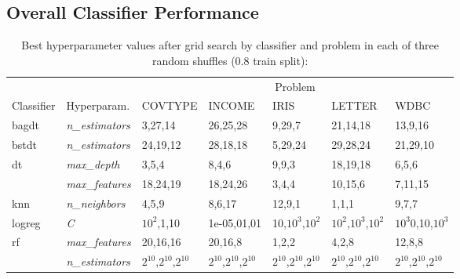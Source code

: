 \documentclass[twoside,11pt]{article}
\begin{document}
		\subsection{Overall Classifier Performance}
			\lipsum
			
			\begin{table}[ph!]
				\caption{Best hyperparameter values after grid search by classifier and problem in each of three random shuffles (0.8 train split):}
				\label{tab:best_hyperparams_by_problem_shuffles}
				\begin{tabular}{lllllll}
					\toprule
					& & \multicolumn{5}{c}{Problem} \\\cline{3-7}
					Classifier & Hyperparam. &         COVTYPE &           INCOME &               IRIS &              LETTER &                 WDBC \\
					\midrule
					bagdt & \textit{n\_estimators} &         3,27,14 &         26,25,28 &             9,29,7 &            21,14,18 &              13,9,16 \\
					bstdt & \textit{n\_estimators}  &        24,19,12 &         28,18,18 &            5,29,24 &            29,28,24 &             21,29,10 \\
					\multirow{2}{*}{dt} & \textit{max\_depth} &           3,5,4 &            8,4,6 &              9,9,3 &            18,19,18 &                6,5,6 \\
					& \textit{max\_features} &        18,24,19 &         18,24,26 &              3,4,4 &             10,15,6 &              7,11,15 \\
					knn & \textit{n\_neighbors} &           4,5,9 &           8,6,17 &             12,9,1 &               1,1,1 &                9,7,7 \\
					logreg & \textit{C} &  $10^2$,1,10 &  1e-05,01,01 &  10,$10^3$,$10^2$ &  $10^2$,$10^3$,$10^2$ &  $10^3$0,10,$10^3$ \\
					\multirow{2}{*}{rf} & \textit{max\_features} &        20,16,16 &          20,16,8 &              1,2,2 &               4,2,8 &               12,8,8 \\
					& \textit{n\_estimators} &  $2^{10}$,$2^{10}$,$2^{10}$ &   $2^{10}$,$2^{10}$,$2^{10}$ &     $2^{10}$,$2^{10}$,$2^{10}$ &      $2^{10}$,$2^{10}$,$2^{10}$ &       $2^{10}$,$2^{10}$,$2^{10}$ \\
					\bottomrule
				\end{tabular}
			
			\end{table}
			
\end{document}
